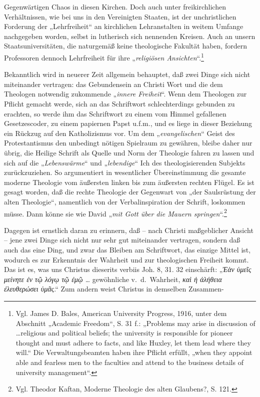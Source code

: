Gegenwärtigen Chaos in diesen Kirchen. Doch auch unter freikirchlichen Verhältnissen, wie bei uns in den Vereinigten Staaten, ist der unchristlichen Forderung der „Lehrfreiheit“ an kirchlichen Lehranstalten in weitem Umfange nachgegeben worden, selbst in lutherisch sich nennenden Kreisen. Auch an unsern Staatsuniversitäten, die naturgemäß keine theologische Fakultät haben, fordern Professoren dennoch Lehrfreiheit für ihre „\textit{religiösen Ansichten}“.\footnote{Vgl. James D. Bales, American University Progress, 1916, unter dem Abschnitt „Academic Freedom“, S. 31 f.: „Problems may arise in discussion of \ldots religious and political beliefs; the university is responsible for pioneer thought and must adhere to facts, and like Huxley, let them lead where they will.“ Die Verwaltungsbeamten haben ihre Pflicht erfüllt, „when they appoint able and fearless men to the faculties and attend to the business details of university management“.} \par Bekanntlich wird in neuerer Zeit allgemein behauptet, daß zwei Dinge sich nicht miteinander vertragen: das Gebundensein an Christi Wort und die dem Theologen notwendig zukommende „\textit{innere Freiheit}“. Wenn dem Theologen zur Pflicht gemacht werde, sich an das Schriftwort schlechterdings gebunden zu erachten, so werde ihm das Schriftwort zu einem vom Himmel gefallenen Gesetzescoder, zu einem papiernen Papst u.f.m., und es liege in dieser Beziehung ein Rückzug auf den Katholizismus vor. Um dem „\textit{evangelischen}“ Geist des Protestantismus den unbedingt nötigen Spielraum zu gewähren, bleibe daher nur übrig, die Heilige Schrift als Quelle und Norm der Theologie fahren zu lassen und sich auf die „\textit{Lebenswärme}“ und „\textit{lebendige}“ Ich des theologisierenden Subjekts zurückzuziehen. So argumentiert in wesentlicher Übereinstimmung die gesamte moderne Theologie vom äußersten linken bis zum äußersten rechten Flügel. Es ist gesagt worden, daß die rechte Theologie der Gegenwart von „der Saulsrüstung der alten Theologie“, namentlich von der Verbalinspiration der Schrift, loskommen müsse. Dann könne sie wie David „\textit{mit Gott über die Mauern springen}“.\footnote{Vgl. Theodor Kaftan, Moderne Theologie des alten Glaubens?, S. 121.} \par Dagegen ist ernstlich daran zu erinnern, daß – nach Christi maßgeblicher Ansicht – jene zwei Dinge sich nicht nur sehr gut miteinander vertragen, sondern daß auch das eine Ding, und zwar das Bleiben am Schriftwort, das einzige Mittel ist, wodurch es zur Erkenntnis der Wahrheit und zur theologischen Freiheit kommt. Das ist es, was uns Christus dieserits verbiis Joh. 8, 31. 32 einschärft: „\textit{Ἐὰν ὑμεῖς μείνητε ἐν τῷ λόγῳ τῷ ἐμῷ \ldots} gewöhnliche v.\ d.\ Wahrheit, \textit{καὶ ἡ ἀλήθεια ἐλευθερώσει ὑμᾶς}.“ Zum andern weist Christus in demselben Zusammen-